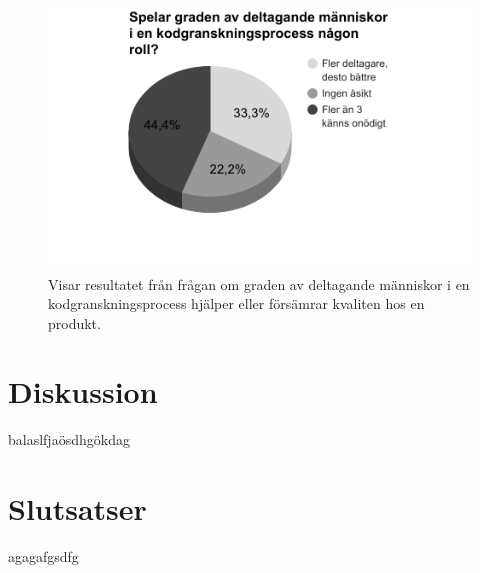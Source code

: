 \begin{figure}[H]
	\includegraphics[width=\linewidth]{figures/grade_participation.png}
	\caption{Visar resultatet från frågan om graden av deltagande människor i en kodgranskningsprocess hjälper eller försämrar kvaliten hos en produkt.}
	\label{fig:grade_participation}
\end{figure}

\section{Diskussion}
\label{sec:discussion-wallstrom}
balaslfjaösdhgökdag

\section{Slutsatser}
\label{sec:conclusions-wallstrom}
agagafgsdfg


